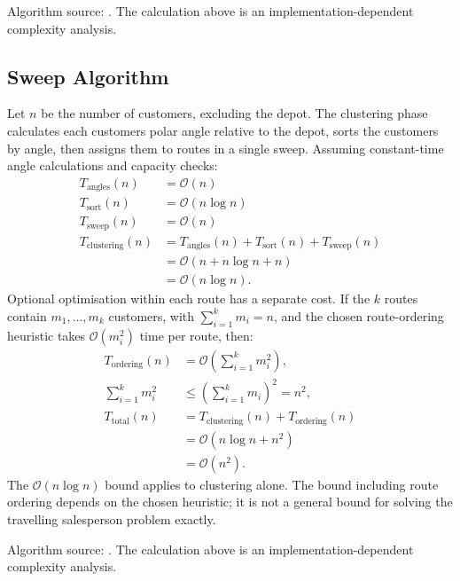 \documentclass[11pt]{article}
\begin{document}
\begin{appendices}
Algorithm source: \textcite{clarke1964scheduling}. The calculation above is an implementation-dependent complexity analysis.

\subsection{Sweep Algorithm}
\label{app:complexity_sweep}
Let $n$ be the number of customers, excluding the depot. The clustering phase calculates each customer\textquotesingle s polar angle relative to the depot, sorts the customers by angle, then assigns them to routes in a single sweep. Assuming constant-time angle calculations and capacity checks:
\[
\begin{aligned}
    T_{\text{angles}}(n) &= \mathcal{O}(n) \\
    T_{\text{sort}}(n) &= \mathcal{O}(n\log n) \\
    T_{\text{sweep}}(n) &= \mathcal{O}(n) \\[0.5em]
    T_{\text{clustering}}(n) &= T_{\text{angles}}(n)+T_{\text{sort}}(n)+T_{\text{sweep}}(n) \\
    &= \mathcal{O}(n+n\log n+n) \\
    &= \mathcal{O}(n\log n).
\end{aligned}
\]
Optional optimisation within each route has a separate cost. If the $k$ routes contain $m_1,\dots,m_k$ customers, with $\sum_{i=1}^{k}m_i=n$, and the chosen route-ordering heuristic takes $\mathcal{O}(m_i^2)$ time per route, then:
\[
\begin{aligned}
    T_{\text{ordering}}(n) &= \mathcal{O}\!\left(\sum_{i=1}^{k}m_i^2\right), \\
    \sum_{i=1}^{k}m_i^2 &\le \left(\sum_{i=1}^{k}m_i\right)^2=n^2, \\[0.5em]
    T_{\text{total}}(n) &= T_{\text{clustering}}(n)+T_{\text{ordering}}(n) \\
    &= \mathcal{O}(n\log n+n^2) \\
    &= \mathcal{O}(n^2).
\end{aligned}
\]
The $\mathcal{O}(n\log n)$ bound applies to clustering alone. The bound including route ordering depends on the chosen heuristic; it is not a general bound for solving the travelling salesperson problem exactly.

Algorithm source: \textcite{gillett1974heuristic}. The calculation above is an implementation-dependent complexity analysis.



\end{appendices}
\end{document}
